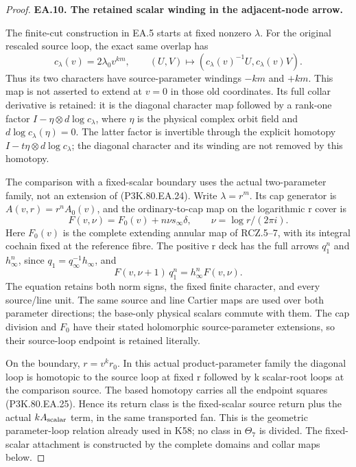 \begin{proof}
\par\medskip\noindent\textbf{EA.10. The retained scalar winding in the adjacent-node arrow.}\par\nopagebreak[4]

The finite-cut construction in EA.5 starts at fixed nonzero
\(\lambda\). For the original rescaled source loop, the exact same
overlap has
\[
 c_\lambda(v)=2\lambda_0v^{km},\qquad
 (U,V)\longmapsto(c_\lambda(v)^{-1}U,c_\lambda(v)V).
 \tag{P3K.80.EA.24}
\]
Thus its two characters have source-parameter windings \(-km\)
and \(+km\). This map is not asserted to extend at \(v=0\) in
those old coordinates. Its full collar derivative is retained: it is
the diagonal character map followed by a rank-one factor
\(I-\eta\otimes d\log c_\lambda\), where \(\eta\) is the
physical complex orbit field and
\(d\log c_\lambda(\eta)=0\). The latter factor is invertible
through the explicit homotopy
\(I-t\eta\otimes d\log c_\lambda\); the diagonal character and
its winding are not removed by this homotopy.

The comparison with a fixed-scalar boundary uses the actual two-parameter
family, not an extension of (P3K.80.EA.24). Write \(\lambda=r^m\). Its
cap generator is \(A(v,r)=r^nA_0(v)\), and the ordinary-to-cap
map on the logarithmic r cover is
\[
 F(v,\nu)=F_0(v)+n\nu s_\infty\delta,\qquad
 \nu=\log r/(2\pi i).
\]
Here \(F_0(v)\) is the complete extending annular map of RCZ.5--7,
with its integral cochain fixed at the reference fibre. The positive
r deck has the full arrows \(q_1^n\) and \(h_\infty^n\), since
\(q_1=q_\infty^{-1}h_\infty\), and
\[
          F(v,\nu+1)\,q_1^n=h_\infty^n F(v,\nu).
 \tag{P3K.80.EA.25}
\]
The equation retains both norm signs, the fixed finite character,
and every source/line unit. The same source and line Cartier maps
are used over both parameter directions; the base-only physical
scalars commute with them. The cap division and \(F_0\) have their
stated holomorphic source-parameter extensions, so their source-loop
endpoint is retained literally.

On the boundary, \(r=v^k r_0\). In this actual product-parameter
family the diagonal loop is homotopic to the source loop at fixed r
followed by k scalar-root loops at the comparison source. The based
homotopy carries all the endpoint squares (P3K.80.EA.25). Hence its return
class is the fixed-scalar source return plus the actual
\(kA_{\rm scalar}\) term, in the same transported fan. This is
the geometric parameter-loop relation already used in K58; no
class in \(\Theta_7\) is divided. The fixed-scalar attachment is constructed by the complete domains and collar maps below.


\end{proof}
